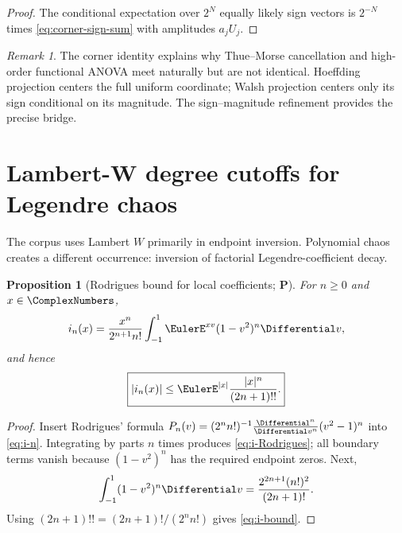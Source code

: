 \documentclass[11pt,oneside]{article}
\newtheorem{proposition}[theorem]{Proposition}
\theoremstyle{definition}
\theoremstyle{remark}
\newtheorem{remark}[theorem]{Remark}
\newcommand{\statusP}{\textcolor{deepgreen}{\textbf{P}}}
\begin{document}
\begin{proof}
The conditional expectation over $2^N$ equally likely sign vectors is
$2^{-N}$ times \eqref{eq:corner-sign-sum} with amplitudes $a_jU_j$.
\end{proof}

\begin{remark}
The corner identity explains why Thue--Morse cancellation and high-order
functional ANOVA meet naturally but are not identical.  Hoeffding projection
centers the full uniform coordinate; Walsh projection centers only its sign
conditional on its magnitude.  The sign--magnitude refinement provides the
precise bridge.
\end{remark}

\section[Lambert-W cutoffs for Legendre chaos]
{Lambert-W degree cutoffs for Legendre chaos}
\label{sec:Lambert-cutoff}

The corpus uses Lambert $W$ primarily in endpoint inversion.  Polynomial chaos
creates a different occurrence: inversion of factorial Legendre-coefficient
decay.

\begin{proposition}[Rodrigues bound for local coefficients; \statusP]
\label{prop:Rodrigues-bound}
For $n\ge0$ and $x\in\ComplexNumbers$,
\begin{equation}
 i_n(x)=\frac{x^n}{2^{n+1}n!}
 \int_{-1}^1\EulerE^{xv}(1-v^2)^n\Differential v,
 \label{eq:i-Rodrigues}
\end{equation}
and hence
\begin{equation}
 \boxed{
 |i_n(x)|\le\EulerE^{|x|}\frac{|x|^n}{(2n+1)!!}.}
 \label{eq:i-bound}
\end{equation}
\end{proposition}

\begin{proof}
Insert Rodrigues' formula
$P_n(v)=(2^nn!)^{-1}\frac{\Differential^n}{\Differential v^n}(v^2-1)^n$ into
\eqref{eq:i-n}.  Integrating by parts $n$ times produces
\eqref{eq:i-Rodrigues}; all boundary terms vanish because $(1-v^2)^n$ has the
required endpoint zeros.  Next,
\[
 \int_{-1}^1(1-v^2)^n\Differential v
 =\frac{2^{2n+1}(n!)^2}{(2n+1)!}.
\]
Using $(2n+1)!!=(2n+1)!/(2^nn!)$ gives \eqref{eq:i-bound}.
\end{proof}
\end{document}
